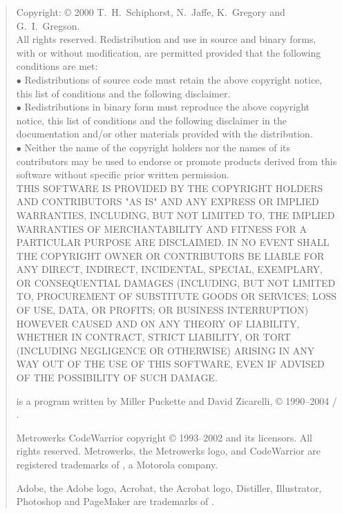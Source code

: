 \begin{quote}
\begin{small}
Copyright: \copyright{} 2000 T.~H.~Schiphorst, N.~Jaffe, K.~Gregory and G.~I.~Gregson.
\\
All rights reserved. Redistribution and use in source and binary forms,
with or without modification, are permitted provided that the following conditions are met:\\
$\bullet$ Redistributions of source code must retain the above copyright notice,
this list of conditions and the following disclaimer.\\
$\bullet$ Redistributions in binary form must reproduce the above copyright notice,
this list of conditions and the following disclaimer in the documentation and/or other materials provided with the distribution.\\
$\bullet$ Neither the name of the copyright holders nor the names of its contributors may be used to endorse
or promote products derived from this software without specific prior written permission.\\
THIS SOFTWARE IS PROVIDED BY THE COPYRIGHT HOLDERS AND CONTRIBUTORS "AS IS" AND ANY EXPRESS OR IMPLIED WARRANTIES,
INCLUDING, BUT NOT LIMITED TO, THE IMPLIED WARRANTIES OF MERCHANTABILITY AND FITNESS FOR A PARTICULAR PURPOSE ARE DISCLAIMED.
IN NO EVENT SHALL THE COPYRIGHT OWNER OR CONTRIBUTORS BE LIABLE FOR ANY DIRECT, INDIRECT, INCIDENTAL, SPECIAL, EXEMPLARY,
OR CONSEQUENTIAL DAMAGES (INCLUDING, BUT NOT LIMITED TO, PROCUREMENT OF SUBSTITUTE GOODS OR SERVICES;
LOSS OF USE, DATA, OR PROFITS; OR BUSINESS INTERRUPTION) HOWEVER CAUSED AND ON ANY THEORY OF LIABILITY, WHETHER IN CONTRACT,
STRICT LIABILITY, OR TORT (INCLUDING NEGLIGENCE OR OTHERWISE) ARISING IN ANY WAY OUT OF THE USE OF THIS SOFTWARE,
EVEN IF ADVISED OF THE POSSIBILITY OF SUCH DAMAGE.

\MaxName{} is a program written by Miller Puckette and David Zicarelli, \copyright{} 1990--2004
 / .

Metrowerks CodeWarrior copyright \copyright{} 1993--2002  and its licensors.
All rights reserved.
Metrowerks, the Metrowerks logo, and CodeWarrior are registered trademarks of
, a Motorola company.

Adobe, the Adobe logo, Acrobat, the Acrobat logo, Distiller, Illustrator, Photoshop and PageMaker are trademarks of
.


\end{small}
\end{quote}
